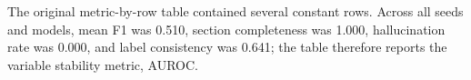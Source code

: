 \begin{table}[!htbp]
  \centering
  \caption{Supplementary Table S7. Multi-seed AUROC stability.}
  \label{tab:s7_multiseed_stability}
  \scriptsize
  \begin{threeparttable}
  \begin{tablenotes}[flushleft]
    \footnotesize
    \item The original metric-by-row table contained several constant rows. Across all seeds and models, mean F1 was 0.510, section completeness was 1.000, hallucination rate was 0.000, and label consistency was 0.641; the table therefore reports the variable stability metric, AUROC.
  \end{tablenotes}
  \end{threeparttable}
\end{table}

